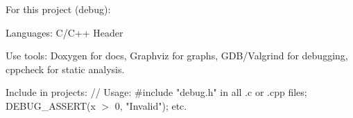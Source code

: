 For this project (debug)\+:
\begin{DoxyItemize}
\item Languages\+: C/\+C++ Header
\item Use tools\+: Doxygen for docs, Graphviz for graphs, GDB/\+Valgrind for debugging, cppcheck for static analysis.
\end{DoxyItemize}

Include  in projects\+: // Usage\+: \#include "{}debug.\+h"{} in all .c or .cpp files; DEBUG\+\_\+\+ASSERT(x \texorpdfstring{$>$}{>} 0, "{}\+Invalid"{}); etc. 